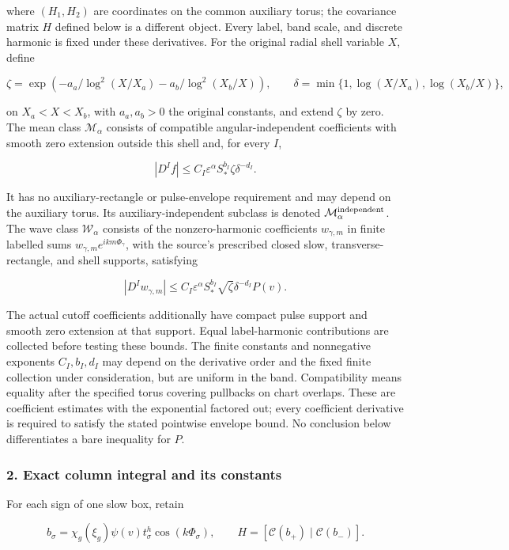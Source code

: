 \documentclass[10pt,a4paper]{article}
\begin{document}
where \((H_1,H_2)\) are coordinates on the common auxiliary torus; the covariance matrix \(H\) defined below is a different object. Every label, band scale, and discrete harmonic is fixed under these derivatives. For the original radial shell variable \(X\), define

\[
\zeta=\exp\left(-a_a/\log^2(X/X_a)-a_b/\log^2(X_b/X)\right),
\qquad \delta=\min\{1,\log(X/X_a),\log(X_b/X)\},
\]

on \(X_a<X<X_b\), with \(a_a,a_b>0\) the original constants, and extend \(\zeta\) by zero. The mean class \(\mathcal M_\alpha\) consists of compatible angular-independent coefficients with smooth zero extension outside this shell and, for every \(I\),

\[
|D^If|\le C_I\varepsilon^\alpha S_*^{b_I}\zeta\delta^{-d_I}.
\]

It has no auxiliary-rectangle or pulse-envelope requirement and may depend on the auxiliary torus. Its auxiliary-independent subclass is denoted \(\mathcal M_\alpha^{\rm independent}\). The wave class \(\mathcal W_\alpha\) consists of the nonzero-harmonic coefficients \(w_{\gamma,m}\) in finite labelled sums \(w_{\gamma,m}e^{ikm\Phi_\gamma}\), with the source's prescribed closed slow, transverse-rectangle, and shell supports, satisfying

\[
|D^Iw_{\gamma,m}|\le C_I\varepsilon^\alpha S_*^{b_I}
\sqrt\zeta\delta^{-d_I}P(v).
\]

The actual cutoff coefficients additionally have compact pulse support and smooth zero extension at that support. Equal label-harmonic contributions are collected before testing these bounds. The finite constants and nonnegative exponents \(C_I,b_I,d_I\) may depend on the derivative order and the fixed finite collection under consideration, but are uniform in the band. Compatibility means equality after the specified torus covering pullbacks on chart overlaps. These are coefficient estimates with the exponential factored out; every coefficient derivative is required to satisfy the stated pointwise envelope bound. No conclusion below differentiates a bare inequality for \(P\).

\subsubsection{2. Exact column integral and its constants}

For each sign of one slow box, retain

\[
b_\sigma=\chi_g(\xi_g)\psi(v)t_\sigma^h\cos(k\Phi_\sigma),
\qquad H=[\mathcal C(b_+)\mid\mathcal C(b_-)].
\]
\end{document}
